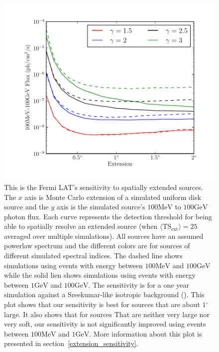 \documentclass[preprint]{aastex}
\newcommand{\mev}{\text{MeV}\xspace}
\newcommand{\gev}{\text{GeV}\xspace}
\newcommand{\tsext}{{\ensuremath{\text{TS}_\text{ext}}}\xspace}
\renewcommand{\deg}{\ensuremath{^\circ}\xspace}
\begin{document}
\clearpage

\begin{figure}
  \begin{center}
    \includegraphics{mc_plots/index_sensitivity.pdf}
    \end{center}
    \caption{This is the Fermi LAT's sensitivity to spatially
    extended sources. The $x$ axis is Monte Carlo extension of a
    simulated uniform disk source and the $y$ axis is the simulated
    source's $100\mev$ to $100\gev$ photon flux. Each curve represents
    the detection threshold for being able to spatially resolve an
    extended source (when $\langle\tsext\rangle=25$ averaged over
    multiple simulations).  
    All sources have an assumed powerlaw spectrum and the different
    colors are for sources of different simulated spectral indices.
    The dashed line shows simulations using events with energy between 
    $100\mev$ and $100\gev$ while the solid lien shows simulations
    using events with energy between $1\gev$ and $100\gev$.
    The sensitivity is for a one year simulation against a Sreekumar-like
    isotropic background (\cite{sreekumar_isotropic}).
    This plot shows that our sensitivity is best for sources that are
    about $1\deg$ large. It also shows that for sources That are neither
    very large nor very soft, our sensitivity is not significantly
    improved using events between $100\mev$ and $1\gev$.  More information
    about this plot is presented in section~\ref{extension_sensitivity}.
    }\label{index_sensitivity}
  \end{figure}
\end{document}
